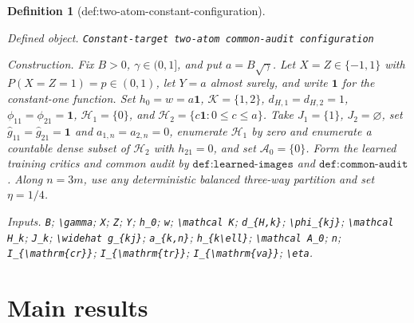 \documentclass{article}
\newtheorem{definition}{Definition}
\begin{document}
\begin{definition}[def:two-atom-constant-configuration]\label{def:two-atom-constant-configuration}
\par\smallskip\noindent\emph{Defined object.} \texttt{Constant-\allowbreak{}target two-\allowbreak{}atom common-\allowbreak{}audit configuration}
\par\smallskip\noindent\emph{Construction.} Fix \(B>0\), \(\gamma\in(0,1]\), and put \(a=B\sqrt{\gamma}\). Let \(X=Z\in\{-1,1\}\) with \(P(X=Z=1)=p\in(0,1)\), let \(Y=a\) almost surely, and write \(\mathbf 1\) for the constant-one function. Set \(h_0=w=a\mathbf 1\), \(\mathcal K=\{1,2\}\), \(d_{H,1}=d_{H,2}=1\), \(\phi_{11}=\phi_{21}=\mathbf 1\), \(\mathcal H_1=\{0\}\), and \(\mathcal H_2=\{c\mathbf 1:0\le c\le a\}\). Take \(J_1=\{1\}\), \(J_2=\varnothing\), set \(\widehat g_{11}=\widehat g_{21}=\mathbf 1\) and \(a_{1,n}=a_{2,n}=0\), enumerate \(\mathcal H_1\) by zero and enumerate a countable dense subset of \(\mathcal H_2\) with \(h_{21}=0\), and set \(\mathcal A_0=\{0\}\). Form the learned training critics and common audit by \(\texttt{def:learned-images}\) and \(\texttt{def:common-audit}\). Along \(n=3m\), use any deterministic balanced three-way partition and set \(\eta=1/4\).
\par\smallskip\noindent\emph{Inputs.} \texttt{B}; \texttt{\textbackslash{}\allowbreak{}gamma}; \texttt{X}; \texttt{Z}; \texttt{Y}; \texttt{h\_\allowbreak{}0}; \texttt{w}; \texttt{\textbackslash{}\allowbreak{}mathcal K}; \texttt{d\_\allowbreak{}\{H,\allowbreak{}k\}\allowbreak{}}; \texttt{\textbackslash{}\allowbreak{}phi\_\allowbreak{}\{kj\}\allowbreak{}}; \texttt{\textbackslash{}\allowbreak{}mathcal H\_\allowbreak{}k}; \texttt{J\_\allowbreak{}k}; \texttt{\textbackslash{}\allowbreak{}widehat g\_\allowbreak{}\{kj\}\allowbreak{}}; \texttt{a\_\allowbreak{}\{k,\allowbreak{}n\}\allowbreak{}}; \texttt{h\_\allowbreak{}\{k\textbackslash{}\allowbreak{}ell\}\allowbreak{}}; \texttt{\textbackslash{}\allowbreak{}mathcal A\_\allowbreak{}0}; \texttt{n}; \texttt{I\_\allowbreak{}\{\textbackslash{}\allowbreak{}mathrm\{cr\}\allowbreak{}\}\allowbreak{}}; \texttt{I\_\allowbreak{}\{\textbackslash{}\allowbreak{}mathrm\{tr\}\allowbreak{}\}\allowbreak{}}; \texttt{I\_\allowbreak{}\{\textbackslash{}\allowbreak{}mathrm\{va\}\allowbreak{}\}\allowbreak{}}; \texttt{\textbackslash{}\allowbreak{}eta}.
\end{definition}

\section{Main results}
\end{document}
